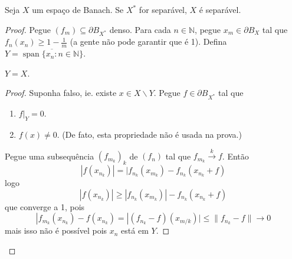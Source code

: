 \documentclass[portuguese]{article}
\theoremstyle{definition}
\newcommand{\N}{\mathbb{N}}
\begin{document}
	\begin{teo}
		Seja $X$ um espaço de Banach. Se $X^*$ for separável, $X$ é separável. 
	\end{teo}
	\begin{proof}
		Pegue $(f_m)\subseteq\partial B_{X^*}$ denso. Para cada $n\in\N$, pegue $x_m\in\partial B_X$ tal que $f_n(x_n)\geq1-\frac{1}{m}$ (a gente não pode garantir que é 1). Defina $Y=\overline{\operatorname{span}\{x_n:n\in\N\}}$.
		\begin{af*}
			$Y=X$.
		\end{af*}
		\begin{proof}
			Suponha falso, ie. existe $x\in X\backslash Y$. Pegue $f\in\partial B_{X^*}$ tal que
			\begin{enumerate}
				\item $f|_Y=0$.
				\item $f(x)\neq0$. (De fato, esta propriedade não é usada na prova.)
			\end{enumerate}
			Pegue uma subsequência $(f_{m_k})_k$ de $(f_n)$ tal que $f_{m_k}\overset{k}{\to}f$. Então
			\[|f(x_{n_k})|=|f_{n_k}(x_{m_k})-f_{n_k}(x_{n_k}+f)\]
			logo
			\[|f(x_{n_k})|\geq|f_{n_k}(x_{m_k})|-f_{n_k}(x_{n_k}+f)\]
			que converge a 1, pois
			\[|f_{m_k}(x_{n_k})-f(x_{n_k})=|(f_{n_k}-f)(x_{m/k})|\leq\| f_{n_k}-f\|\to0\]
			mais isso não é possível pois $x_n$ está em $Y$.
		\end{proof}
	\end{proof}
	
\end{document}
